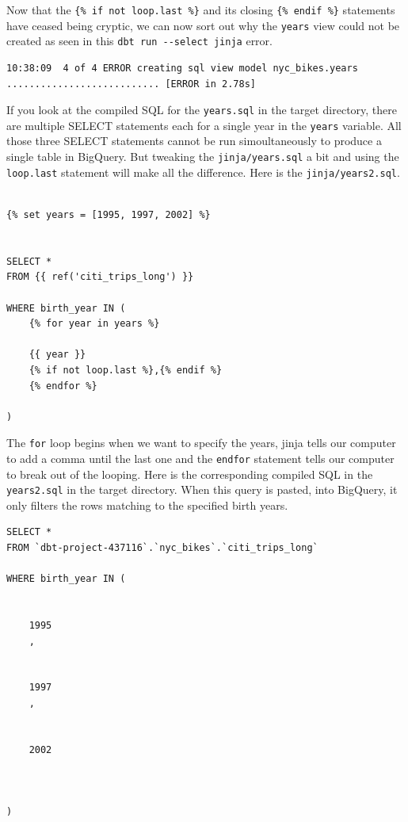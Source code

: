 \documentclass[
]{book}
\begin{document}
Now that the \texttt{\{\%\ if\ not\ loop.last\ \%\}} and its closing \texttt{\{\%\ endif\ \%\}} statements have ceased being cryptic, we can now sort out why the \texttt{years} view could not be created as seen in this \texttt{dbt\ run\ -\/-select\ jinja} error.

\begin{verbatim}
10:38:09  4 of 4 ERROR creating sql view model nyc_bikes.years ........................... [ERROR in 2.78s]
\end{verbatim}

If you look at the compiled SQL for the \texttt{years.sql} in the target directory, there are multiple SELECT statements each for a single year in the \texttt{years} variable. All those three SELECT statements cannot be run simoultaneously to produce a single table in BigQuery. But tweaking the \texttt{jinja/years.sql} a bit and using the \texttt{loop.last} statement will make all the difference. Here is the \texttt{jinja/years2.sql}.

\begin{verbatim}

{% set years = [1995, 1997, 2002] %}


SELECT * 
FROM {{ ref('citi_trips_long') }}

WHERE birth_year IN (
    {% for year in years %}
    
    {{ year }}
    {% if not loop.last %},{% endif %}
    {% endfor %}

)
\end{verbatim}

The \texttt{for} loop begins when we want to specify the years, jinja tells our computer to add a comma until the last one and the \texttt{endfor} statement tells our computer to break out of the looping. Here is the corresponding compiled SQL in the \texttt{years2.sql} in the target directory. When this query is pasted, into BigQuery, it only filters the rows matching to the specified birth years.

\begin{verbatim}
SELECT * 
FROM `dbt-project-437116`.`nyc_bikes`.`citi_trips_long`

WHERE birth_year IN (
    
    
    1995
    ,
    
    
    1997
    ,
    
    
    2002
    
    

)
\end{verbatim}
\end{document}
